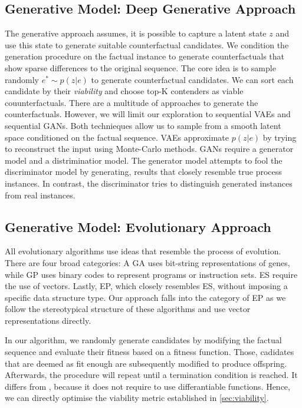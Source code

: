 \documentclass[./../../paper.tex]{subfiles}
\begin{document}
\subsection{Generative Model: Deep Generative Approach}
The generative approach assumes, it is possible to capture a latent state $z$ and use this state to generate suitable counterfactual candidates. We condition the generation procedure on the factual instance to generate counterfactuals that show sparse differences to the original sequence. The core idea is to sample randomly $e^* \sim p(z|e)$ to generate counterfactual candidates. We can sort each candidate by their \emph{viability} and choose top-K contenders as viable couunterfactuals. There are a multitude of approaches to generate the counterfactuals. However, we will limit our exploration to sequential \glspl{VAE} and sequential \glspl{GAN}. Both technieques allow us to sample from a smooth latent space conditioned on the factual sequence. \glspl{VAE} approximate $p(z|e)$ by trying to reconstruct the input using Monte-Carlo methods. \glspl{GAN} require a generator model and a distriminatior model. The generator model attempts to fool the discriminator model by generating, results that closely resemble true process instances. In contrast, the discriminator tries to distinguish generated instances from real instances. 


\subsection{Generative Model: Evolutionary Approach}
\label{sec:evolutionary}
All evolutionary algorithms use ideas that resemble the process of evolution. There are four broad categories: A \gls{GA} uses bit-string representations of genes, while \gls{GP} uses binary codes to represent programs or instruction sets. \gls{ES} require the use of vectors. Lastly, \gls{EP}, which closely resembles \gls{ES}, without imposing a specific data structure type. Our approach falls into the category of \gls{EP} as we follow the stereotypical structure of these algorithms and use vector representations directly.

In our algorithm, we randomly generate candidates by modifying the factual sequence and evaluate their fitness based on a fitness function. Those, cadidates that are deemed as fit enough are subsequently modified to produce offspring. Afterwards, the procedure will repeat until a termination condition is reached. It differs from , because it does not require to use differantiable functions. Hence, we can directly optimise the viability metric established in \autoref{sec:viability}. 
\end{document}
